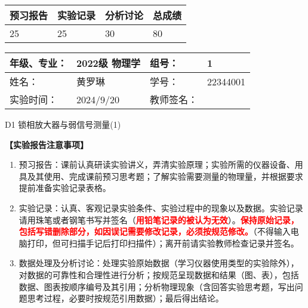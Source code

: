 \documentclass[dvipsnames, svgnames,a4paper,11pt]{article}
\begin{document}
	
	\begin{table}
		\renewcommand\arraystretch{1.7}
		\begin{tabularx}{\textwidth}{
				|X|X|X|X
				|X|X|X|X|}
			\hline
			\multicolumn{2}{|c|}{预习报告}&\multicolumn{2}{|c|}{实验记录}&\multicolumn{2}{|c|}{分析讨论}&\multicolumn{2}{|c|}{总成绩}\\
			\hline
			\LARGE25 & & \LARGE25 & & \LARGE30 & & \LARGE80 & \\
			\hline
		\end{tabularx}
	\end{table}
	
	\begin{table}
		\renewcommand\arraystretch{1.7}
		\begin{tabularx}{\textwidth}{|X|X|X|X|}
			\hline
			年级、专业： & 2022级 物理学 &组号： & 1\\
			\hline
			姓名： & 黄罗琳   & 学号： &  22344001 \\
			\hline
			实验时间： & 2024/9/20 & 教师签名： & \\
			\hline
		\end{tabularx}
	\end{table}
	
	\begin{center}
		\LARGE D1 \quad 锁相放大器与弱信号测量(1)
	\end{center}
	
	
	\textbf{【实验报告注意事项】}
	
		\begin{enumerate}
			\item 预习报告：课前认真研读实验讲义，弄清实验原理；实验所需的仪器设备、用具及其使用、完成课前预习思考题；了解实验需要测量的物理量，并根据要求提前准备实验记录表格。
			\item 实验记录：认真、客观记录实验条件、实验过程中的现象以及数据。实验记录请用珠笔或者钢笔书写并签名（\textcolor{red}{\textbf{用铅笔记录的被认为无效}}）。\textcolor{red}{\textbf{保持原始记录，包括写错删除部分，如因误记需要修改记录，必须按规范修改。}}（不得输入电脑打印，但可扫描手记后打印扫描件）；离开前请实验教师检查记录并签名。
			\item 数据处理及分析讨论：处理实验原始数据（学习仪器使用类型的实验除外），对数据的可靠性和合理性进行分析；按规范呈现数据和结果（图、表），包括数据、图表按顺序编号及其引用；分析物理现象（含回答实验思考题，写出问题思考过程，必要时按规范引用数据）；最后得出结论。
		\end{enumerate}
		
\end{document}
